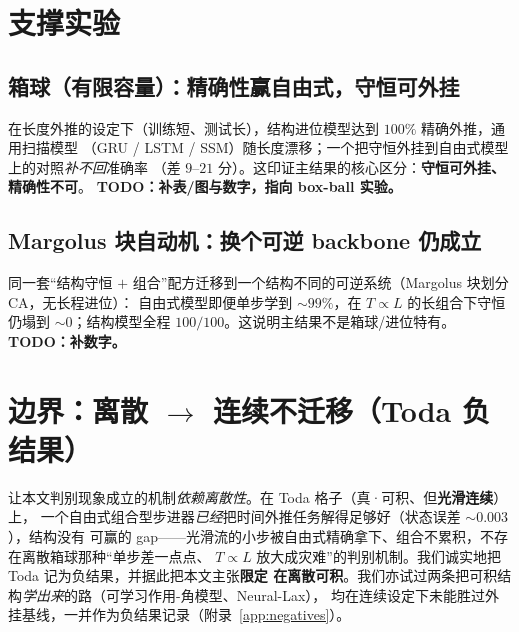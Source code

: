 \documentclass[11pt]{article}
\begin{document}
\section{支撑实验}\label{sec:support}

\subsection{箱球（有限容量）：精确性赢自由式，守恒可外挂}\label{sec:support:bbs}
在长度外推的设定下（训练短、测试长），结构进位模型达到 $100\%$ 精确外推，通用扫描模型
（GRU / LSTM / SSM）随长度漂移；一个把守恒外挂到自由式模型上的对照\emph{补不回}准确率
（差 $9$–$21$ 分）。这印证主结果的核心区分：\textbf{守恒可外挂、精确性不可}。
\textbf{TODO：补表/图与数字，指向 box-ball 实验。}

\subsection{Margolus 块自动机：换个可逆 backbone 仍成立}\label{sec:support:margolus}
同一套“结构守恒 $+$ 组合”配方迁移到一个结构不同的可逆系统（Margolus 块划分 CA，无长程进位）：
自由式模型即便单步学到 $\sim99\%$，在 $T\propto L$ 的长组合下守恒仍塌到 $\sim0$；结构模型全程
$100/100$。这说明主结果不是箱球/进位特有。\textbf{TODO：补数字。}

\section{边界：离散 $\to$ 连续不迁移（Toda 负结果）}\label{sec:boundary}
让本文判别现象成立的机制\emph{依赖离散性}。在 Toda 格子（真·可积、但\textbf{光滑连续}）上，
一个自由式组合型步进器\emph{已经}把时间外推任务解得足够好（状态误差 $\sim0.003$），结构没有
可赢的 gap——光滑流的小步被自由式精确拿下、组合不累积，不存在离散箱球那种“单步差一点点、
$T\propto L$ 放大成灾难”的判别机制。我们诚实地把 Toda 记为负结果，并据此把本文主张\textbf{限定
在离散可积}。我们亦试过两条把可积结构\emph{学出来}的路（可学习作用-角模型、Neural-Lax），
均在连续设定下未能胜过外挂基线，一并作为负结果记录（附录~\ref{app:negatives}）。
\end{document}
